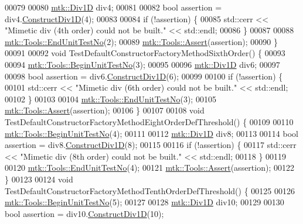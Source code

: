 \begin{DoxyCode}
00079 
00080   \hyperlink{classmtk_1_1Div1D}{mtk::Div1D} div4;
00081 
00082   \textcolor{keywordtype}{bool} assertion = div4.\hyperlink{classmtk_1_1Div1D_a52fcd1542f11e606e36bd188e48bfdf7}{ConstructDiv1D}(4);
00083 
00084   \textcolor{keywordflow}{if} (!assertion) \{
00085     std::cerr << \textcolor{stringliteral}{"Mimetic div (4th order) could not be built."} << std::endl;
00086   \}
00087 
00088   \hyperlink{classmtk_1_1Tools_ad8cf0085133dd40c913fe195bc5b9694}{mtk::Tools::EndUnitTestNo}(2);
00089   \hyperlink{classmtk_1_1Tools_aa311fada9255627d06c56b1e4fedce9e}{mtk::Tools::Assert}(assertion);
00090 \}
00091 
00092 \textcolor{keywordtype}{void} TestDefaultConstructorFactoryMethodSixthOrder() \{
00093 
00094   \hyperlink{classmtk_1_1Tools_a26ee906d28523378522a75e25c3a4e19}{mtk::Tools::BeginUnitTestNo}(3);
00095 
00096   \hyperlink{classmtk_1_1Div1D}{mtk::Div1D} div6;
00097 
00098   \textcolor{keywordtype}{bool} assertion = div6.\hyperlink{classmtk_1_1Div1D_a52fcd1542f11e606e36bd188e48bfdf7}{ConstructDiv1D}(6);
00099 
00100   \textcolor{keywordflow}{if} (!assertion) \{
00101     std::cerr << \textcolor{stringliteral}{"Mimetic div (6th order) could not be built."} << std::endl;
00102   \}
00103 
00104   \hyperlink{classmtk_1_1Tools_ad8cf0085133dd40c913fe195bc5b9694}{mtk::Tools::EndUnitTestNo}(3);
00105   \hyperlink{classmtk_1_1Tools_aa311fada9255627d06c56b1e4fedce9e}{mtk::Tools::Assert}(assertion);
00106 \}
00107 
00108 \textcolor{keywordtype}{void} TestDefaultConstructorFactoryMethodEightOrderDefThreshold() \{
00109 
00110   \hyperlink{classmtk_1_1Tools_a26ee906d28523378522a75e25c3a4e19}{mtk::Tools::BeginUnitTestNo}(4);
00111 
00112   \hyperlink{classmtk_1_1Div1D}{mtk::Div1D} div8;
00113 
00114   \textcolor{keywordtype}{bool} assertion = div8.\hyperlink{classmtk_1_1Div1D_a52fcd1542f11e606e36bd188e48bfdf7}{ConstructDiv1D}(8);
00115 
00116   \textcolor{keywordflow}{if} (!assertion) \{
00117     std::cerr << \textcolor{stringliteral}{"Mimetic div (8th order) could not be built."} << std::endl;
00118   \}
00119 
00120   \hyperlink{classmtk_1_1Tools_ad8cf0085133dd40c913fe195bc5b9694}{mtk::Tools::EndUnitTestNo}(4);
00121   \hyperlink{classmtk_1_1Tools_aa311fada9255627d06c56b1e4fedce9e}{mtk::Tools::Assert}(assertion);
00122 \}
00123 
00124 \textcolor{keywordtype}{void} TestDefaultConstructorFactoryMethodTenthOrderDefThreshold() \{
00125 
00126   \hyperlink{classmtk_1_1Tools_a26ee906d28523378522a75e25c3a4e19}{mtk::Tools::BeginUnitTestNo}(5);
00127 
00128   \hyperlink{classmtk_1_1Div1D}{mtk::Div1D} div10;
00129 
00130   \textcolor{keywordtype}{bool} assertion = div10.\hyperlink{classmtk_1_1Div1D_a52fcd1542f11e606e36bd188e48bfdf7}{ConstructDiv1D}(10);

\end{DoxyCode}
